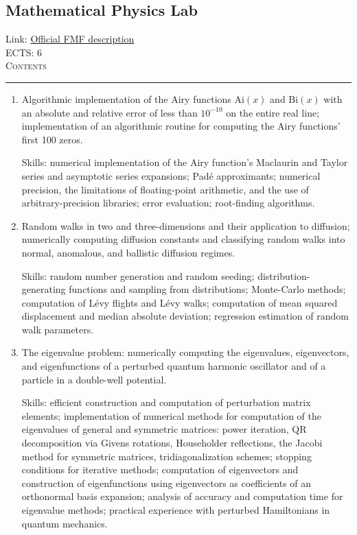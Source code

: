 \documentclass[11pt, a4paper]{article}
\newenvironment{course}[3]{
\subsection{#1}%
Link: \href{#2}{Official FMF description}\\%
ECTS: #3%
\vspace{1ex}
\\
{\large \textsc{Contents}}\\[-0.9ex]%
\rule{\textwidth}{0.5pt}
\vspace{-3ex}
}
{}
\newenvironment{chapter}[1]{
\begin{tcolorbox}[title=#1, breakable]
}
{\end{tcolorbox}}
\begin{document}
\begin{course}{Mathematical Physics Lab}{https://www.fmf.uni-lj.si/en/study-physics/programmes/1fiz/2020/7000777/courses/1159/}{6}
    \label{mathematical_physics_lab}
    
    \begin{chapter}{Projects}
        \begin{enumerate}
        
            \item Algorithmic implementation of the Airy functions $ \mathrm{Ai}(x) $ and $ \mathrm{Bi}(x) $ with an absolute and relative error of less than $ 10^{-10} $ on the entire real line; implementation of an algorithmic routine for computing the Airy functions' first 100 zeros.

            Skills: numerical implementation of the Airy function's Maclaurin and Taylor series and asymptotic series expansions; Padé approximants; numerical precision, the limitations of floating-point arithmetic, and the use of arbitrary-precision libraries; error evaluation; root-finding algorithms.

            \item Random walks in two and three-dimensions and their application to diffusion; numerically computing diffusion constants and classifying random walks into normal, anomalous, and ballistic diffusion regimes.

            Skills: random number generation and random seeding; distribution-generating functions and sampling from distributions; Monte-Carlo methods; computation of Lévy flights and Lévy walks; computation of mean squared displacement and median absolute deviation; regression estimation of random walk parameters.

            \item The eigenvalue problem: numerically computing the eigenvalues, eigenvectors, and eigenfunctions of a perturbed quantum harmonic oscillator and of a particle in a double-well potential.

            Skills: efficient construction and computation of perturbation matrix elements;
            implementation of numerical methods for computation of the eigenvalues of general and symmetric matrices: power iteration, QR decomposition via Givens rotations, Householder reflections, the Jacobi method for symmetric matrices, tridiagonalization schemes; stopping conditions for iterative methods;
            computation of eigenvectors and construction of eigenfunctions using eigenvectors as coefficients of an orthonormal basis expansion;
            analysis of accuracy and computation time for eigenvalue methods; 
            practical experience with perturbed Hamiltonians in quantum mechanics.


\end{enumerate}
\end{chapter}
\end{course}
\end{document}
